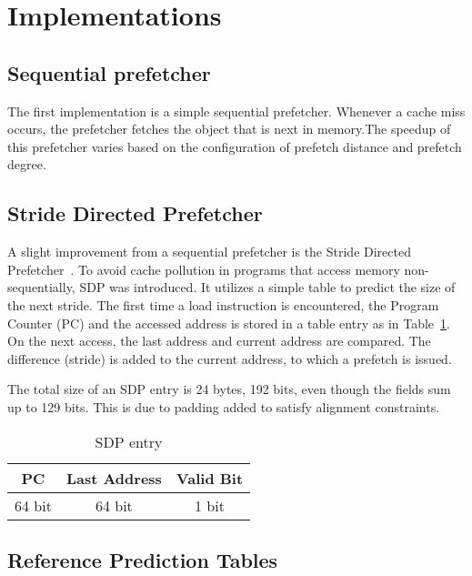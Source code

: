 \section{Implementations}


\subsection{Sequential prefetcher}
The first implementation is a simple sequential prefetcher.  Whenever
a cache miss occurs, the prefetcher fetches the object that is next in
memory.The speedup of this prefetcher varies based on the
configuration of prefetch distance and prefetch degree.

\subsection{Stride Directed Prefetcher}
A slight improvement from a sequential prefetcher is the Stride
Directed Prefetcher~\cite{sdp}.  To avoid cache pollution in programs
that access memory non-sequentially, SDP was introduced. It utilizes a
simple table to predict the size of the next stride. The first time a
load instruction is encountered, the Program Counter (PC) and the
accessed address is stored in a table entry as in
Table~\ref{table:sdpentry}. On the next access, the last address and
current address are compared. The difference (stride) is added to the
current address, to which a prefetch is issued.

The total size of an SDP entry is 24 bytes, 192 bits, even though the
fields sum up to 129 bits. This is due to padding added to satisfy
alignment constraints.

\begin{table}[h!]
  \centering
  \begin{tabular}{ | c | c | c |}
    \hline
    PC & Last Address & Valid Bit \\ \hline
    64 bit & 64 bit & 1 bit \\ \hline
  \end{tabular}
  \caption{SDP entry}
  \label{table:sdpentry}
\end{table}


\subsection{Reference Prediction Tables}

